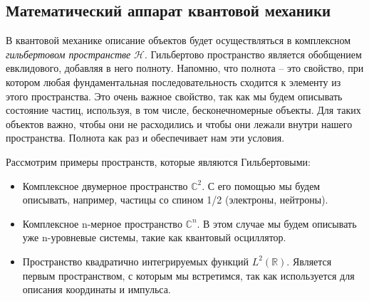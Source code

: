 \subsection{Математический аппарат квантовой механики}
\hspace{1em} В квантовой механике описание объектов будет осуществляться в комплексном \textit{гильбертовом пространстве} $\mathcal{H}$. Гильбертово пространство является обобщением евклидового, добавляя в него полноту. Напомню, что полнота -- это свойство, при котором любая фундаментальная последовательность сходится к элементу из этого пространства. Это очень важное свойство, так как мы будем описывать состояние частиц, используя, в том числе, бесконечномерные объекты. Для таких объектов важно, чтобы они не расходились и чтобы они лежали внутри нашего пространства. Полнота как раз и обеспечивает нам эти условия. 

Рассмотрим примеры пространств, которые являются Гильбертовыми: 
\begin{itemize}
    \item Комплексное двумерное пространство $\mathbb{C}^2$. С его помощью мы будем описывать, например, частицы со спином 1/2 (электроны, нейтроны).
    \item Комплексное n-мерное пространство $\mathbb{C}^n$. В этом случае мы будем описывать уже n-уровневые системы, такие как квантовый осциллятор.
    \item Пространство квадратично интегрируемых функций $L^2(\mathbb{R})$. Является первым пространством, с которым мы встретимся, так как используется для описания координаты и импульса.
\end{itemize}

